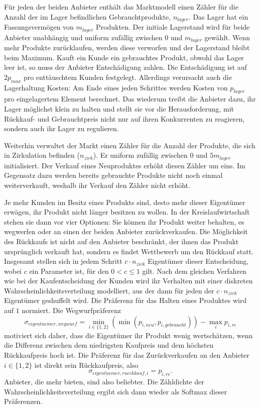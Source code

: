 Für jeden der beiden Anbieter enthält das Marktmodell einen Zähler für die Anzahl der im Lager befindlichen Gebrauchtprodukte, $n_{lager}$.
Das Lager hat ein Fassungsvermögen von $m_{lager}$ Produkten.
Der initiale Lagerstand wird für beide Anbieter unabhängig und uniform zufällig zwischen $0$ und $m_{lager}$ gewählt.
Wenn mehr Produkte zurücklaufen, werden diese verworfen und der Lagerstand bleibt beim Maximum.
Kauft ein Kunde ein gebrauchtes Produkt, obwohl das Lager leer ist, so muss der Anbieter Entschädigung zahlen.
Die Entschädigung ist auf $2 p_{max}$ pro enttäuschtem Kunden festgelegt.
Allerdings verursacht auch die Lagerhaltung Kosten: Am Ende eines jeden Schrittes werden Kosten von $p_{lager}$ pro eingelagertem Element berechnet.
Das wiederum treibt die Anbieter dazu, ihr Lager möglichst klein zu halten und stellt sie vor die Herausforderung, mit Rückkauf- und Gebrauchtpreis nicht nur auf ihren Konkurrenten zu reagieren, sondern auch ihr Lager zu regulieren.

Weiterhin verwaltet der Markt einen Zähler für die Anzahl der Produkte, die sich in Zirkulation befinden ($n_{zirk}$).
Er uniform zufällig zwischen $0$ und $5 m_{lager}$ initialisiert.
Der Verkauf eines Neuproduktes erhöht diesen Zähler um eins.
Im Gegensatz dazu werden bereits gebrauchte Produkte nicht noch einmal weiterverkauft, weshalb ihr Verkauf den Zähler nicht erhöht.

Je mehr Kunden im Besitz eines Produkts sind, desto mehr dieser Eigentümer erwägen, ihr Produkt nicht länger besitzen zu wollen.
In der Kreislaufwirtschaft stehen sie dann vor vier Optionen:
Sie können ihr Produkt weiter behalten, es wegwerfen oder an einen der beiden Anbieter zurückverkaufen.
Die Möglichkeit des Rückkaufs ist nicht auf den Anbieter beschränkt, der ihnen das Produkt ursprünglich verkauft hat, sondern es findet Wettbewerb um den Rückkauf statt.
Insgesamt stellen sich in jedem Schritt $c \cdot n_{zirk}$ Eigentümer dieser Entscheidung, wobei $c$ ein Parameter ist, für den $0 < c \leq 1$ gilt.
Nach dem gleichen Verfahren wie bei der Kaufentscheidung der Kunden wird ihr Verhalten mit einer diskreten Wahrscheinlichkeitsverteilung modelliert, aus der dann für jeden der $c \cdot n_{zirk}$ Eigentümer geshuffelt wird.
Die Präferenz für das Halten eines Produktes wird auf $1$ normiert.
Die Wegwurfpräferenz
\begin{equation}
	\sigma_{eigentuemer, wegwurf} = \min_{i\in\{1, 2\}}{\left(\min{(p_{i, neu}, p_{i, gebraucht})}\right)} - \max_{i}{p_{i, re}}
\end{equation}
motiviert sich daher, dass die Eigentümer ihr Produkt wenig wertschätzen, wenn die Differenz zwischen dem niedrigsten Kaufpreis und dem höchsten Rückkaufpreis hoch ist.
Die Präferenz für das Zurückverkaufen an den Anbieter $i\in\{1, 2\}$ ist direkt sein Rückkaufpreis, also
\begin{equation}
	\sigma_{eigentuemer, rueckkauf, i} = p_{i, re}.
\end{equation}
Anbieter, die mehr bieten, sind also beliebter.
Die Zähldichte der Wahrscheinlichkeitsverteilung ergibt sich dann wieder als Softmax dieser Präferenzen.

